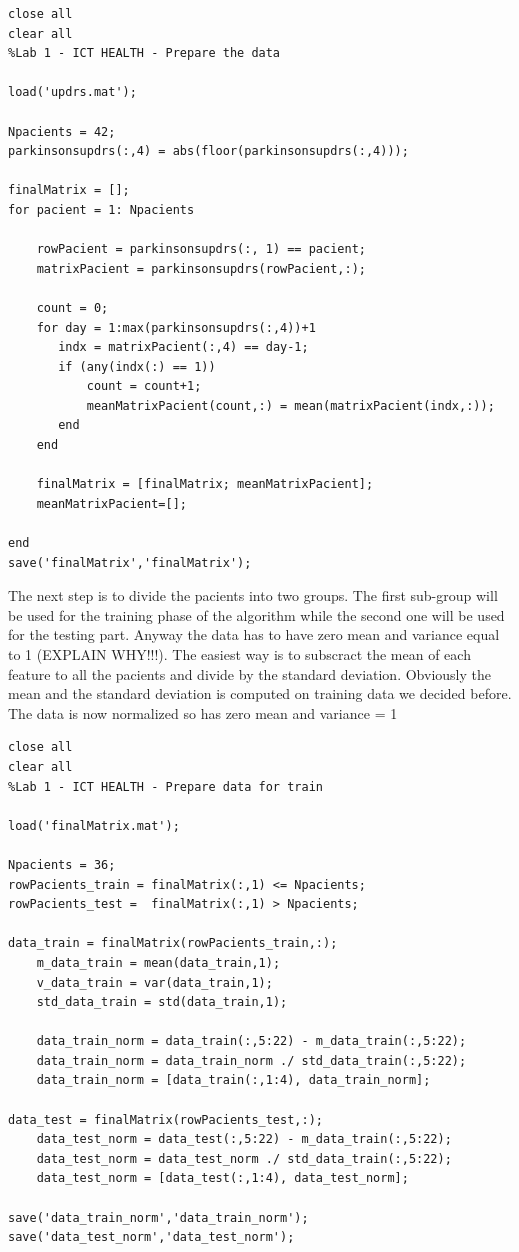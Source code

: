 \documentclass[12pt]{article}
\begin{document}
\begingroup
    \fontsize{12pt}{8pt}\selectfont
\begin{verbatim}
close all
clear all
%Lab 1 - ICT HEALTH - Prepare the data

load('updrs.mat');

Npacients = 42;
parkinsonsupdrs(:,4) = abs(floor(parkinsonsupdrs(:,4)));

finalMatrix = [];
for pacient = 1: Npacients

    rowPacient = parkinsonsupdrs(:, 1) == pacient;
    matrixPacient = parkinsonsupdrs(rowPacient,:);

    count = 0;
    for day = 1:max(parkinsonsupdrs(:,4))+1
       indx = matrixPacient(:,4) == day-1;
       if (any(indx(:) == 1))
           count = count+1;
           meanMatrixPacient(count,:) = mean(matrixPacient(indx,:));
       end
    end

    finalMatrix = [finalMatrix; meanMatrixPacient];
    meanMatrixPacient=[];

end
save('finalMatrix','finalMatrix');
\end{verbatim}
\endgroup
The next step is to divide the pacients into two groups. The first sub-group will be used for the training phase of the algorithm while the second one will be used for the testing part. Anyway the data has to have zero mean and variance equal to 1 (EXPLAIN WHY!!!). The easiest way is to subscract the mean of each feature  
to all the pacients and divide by the standard deviation. Obviously the mean and the standard deviation is computed on training data we decided before. The data is now normalized so has zero mean and variance = 1

\begingroup
	\fontsize{12pt}{8pt}\selectfont

    \begin{verbatim}
close all
clear all
%Lab 1 - ICT HEALTH - Prepare data for train

load('finalMatrix.mat');

Npacients = 36;
rowPacients_train = finalMatrix(:,1) <= Npacients;
rowPacients_test =  finalMatrix(:,1) > Npacients;

data_train = finalMatrix(rowPacients_train,:);
    m_data_train = mean(data_train,1);
    v_data_train = var(data_train,1);
    std_data_train = std(data_train,1);

    data_train_norm = data_train(:,5:22) - m_data_train(:,5:22);
    data_train_norm = data_train_norm ./ std_data_train(:,5:22);
    data_train_norm = [data_train(:,1:4), data_train_norm];

data_test = finalMatrix(rowPacients_test,:);
    data_test_norm = data_test(:,5:22) - m_data_train(:,5:22);
    data_test_norm = data_test_norm ./ std_data_train(:,5:22);
    data_test_norm = [data_test(:,1:4), data_test_norm];

save('data_train_norm','data_train_norm');
save('data_test_norm','data_test_norm');
\end{verbatim}

\endgroup
\end{document}
